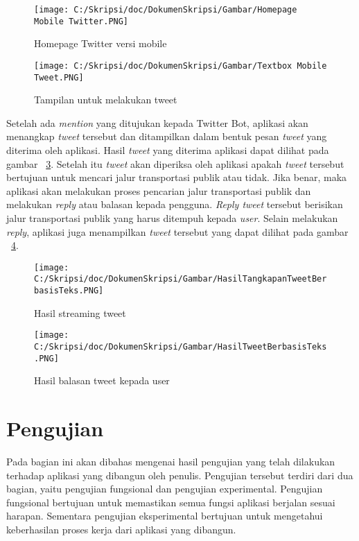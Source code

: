 \begin{figure}[htbp]
	\centering
		\texttt{[image: C:/Skripsi/doc/DokumenSkripsi/Gambar/Homepage Mobile Twitter.PNG]}
	\caption{Homepage Twitter versi mobile}
	\label{fig:Homepage Mobile Twitter}
\end{figure}


\begin{figure}[htbp]
	\centering
		\texttt{[image: C:/Skripsi/doc/DokumenSkripsi/Gambar/Textbox Mobile Tweet.PNG]}
	\caption{Tampilan untuk melakukan tweet}
	\label{fig:Textbox Mobile Tweet}
\end{figure}

Setelah ada \textit{mention} yang ditujukan kepada Twitter Bot, aplikasi akan menangkap \textit{tweet} tersebut dan ditampilkan dalam bentuk pesan \textit{tweet} yang diterima oleh aplikasi. Hasil \textit{tweet} yang diterima aplikasi dapat dilihat pada gambar ~\ref{fig:HasilTangkapanTweetBerbasisTeks}. Setelah itu \textit{tweet} akan diperiksa oleh aplikasi apakah \textit{tweet} tersebut bertujuan untuk mencari jalur transportasi publik atau tidak. Jika benar, maka aplikasi akan melakukan proses pencarian jalur transportasi publik dan melakukan \textit{reply} atau balasan kepada pengguna. \textit{Reply tweet} tersebut berisikan jalur transportasi publik yang harus ditempuh kepada \textit{user}. Selain melakukan \textit{reply}, aplikasi juga menampilkan \textit{tweet} tersebut yang dapat dilihat pada gambar ~\ref{fig:HasilTweetBerbasisTeks}.

\begin{figure}
	\centering
		\texttt{[image: C:/Skripsi/doc/DokumenSkripsi/Gambar/HasilTangkapanTweetBerbasisTeks.PNG]}
	\caption{Hasil streaming tweet}
	\label{fig:HasilTangkapanTweetBerbasisTeks}
\end{figure}

\begin{figure}
	\centering
		\texttt{[image: C:/Skripsi/doc/DokumenSkripsi/Gambar/HasilTweetBerbasisTeks.PNG]}
	\caption{Hasil balasan tweet kepada user}
	\label{fig:HasilTweetBerbasisTeks}
\end{figure}


\section{Pengujian}
Pada bagian ini akan dibahas mengenai hasil pengujian yang telah dilakukan terhadap aplikasi yang dibangun oleh penulis. Pengujian tersebut terdiri dari dua bagian, yaitu pengujian fungsional dan pengujian experimental. Pengujian fungsional bertujuan untuk memastikan semua fungsi aplikasi berjalan sesuai harapan. Sementara pengujian eksperimental bertujuan untuk mengetahui keberhasilan proses kerja dari aplikasi yang dibangun.

